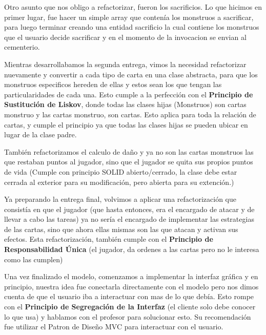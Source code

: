 \medskip


Otro asunto que nos obligo a refactorizar, fueron los sacrificios. Lo que hicimos en primer lugar, fue hacer un simple array que contenía los monstruos a sacrificar, para luego terminar creando una entidad sacrificio la cual contiene los monstruos que el usuario decide sacrificar y en el momento de la invocacion se envian al cementerio.

\medskip

Mientras desarrollabamos la segunda entrega, vimos la necesidad refactorizar nuevamente y convertir a cada tipo de carta en una clase abstracta, para que los monstruos especificos hereden de ellas y estos sean los que tengan las particularidades de cada una. Esto cumple a la perfección con el \textbf{Principio de Sustitución de Liskov}, donde todas las clases hijas (Monstruos) son cartas monstruo y las cartas monstruo, son cartas. Esto aplica para toda la relación de cartas, y cumple el principio ya que todas las clases hijas se pueden ubicar en lugar de la clase padre. 

\medskip

También refactorizamos el calculo de daño y ya no son las cartas monstruos las que restaban puntos al jugador, sino que el jugador se quita sus propios puntos de vida (Cumple con principio SOLID abierto/cerrado, la clase debe estar cerrada al exterior para su modificación, pero abierta para su extención.)

\medskip

Ya preparando la entrega final, volvimos a aplicar una refactorización que consistía en que el jugador (que hasta entonces, era el encargado de atacar y de llevar a cabo las tareas) ya no sería el encargado de implementar las estrategias de las cartas, sino que ahora ellas mismas son las que atacan y activan sus efectos. Esta refactorización, también cumple con el \textbf{Principio de Responsabilidad Única} (el jugador, da ordenes a las cartas pero no le interesa como las cumplen) 

\medskip

Una vez finalizado el modelo, comenzamos a implementar la interfaz gráfica y en principio, nuestra idea fue conectarla directamente con el modelo pero nos dimos cuenta de que el usuario iba a interactuar con mas de lo que debía. Esto rompe con el \textbf{Principio de Segregación de la Interfaz} (el cliente solo debe conocer lo que usa) y hablamos con el profesor para solucionar esto. Su recomendación fue utilizar el Patron de Diseño MVC para interactuar con el usuario.

